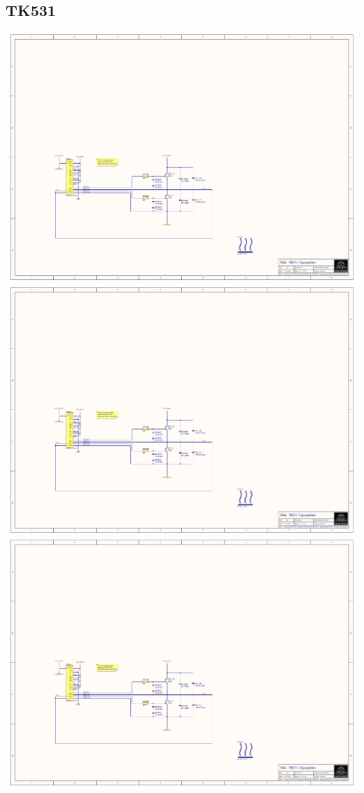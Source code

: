 \subsection{TK531}
\includegraphics[page=4,height=\textheight,width=\textwidth,keepaspectratio]{TK531_Utgangstrinn.PDF}
\includegraphics[page=5,height=\textheight,width=\textwidth,keepaspectratio]{TK531_Utgangstrinn.PDF}
\includegraphics[page=6,height=\textheight,width=\textwidth,keepaspectratio]{TK531_Utgangstrinn.PDF}
